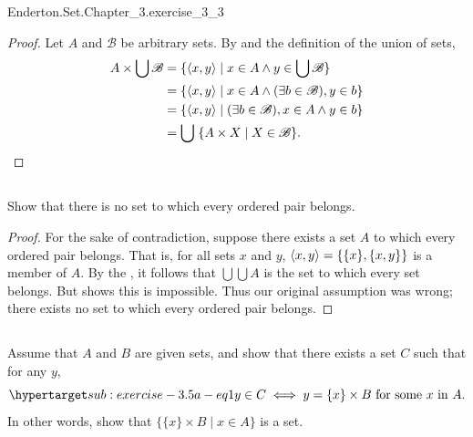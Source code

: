 \documentclass{report}
\begin{document}
    {Enderton.Set.Chapter\_3.exercise\_3\_3}

  \begin{proof}
    Let $A$ and $\mathscr{B}$ be arbitrary sets.
    By  and the definition of the union of sets,
    \begin{align*}
      A \times \bigcup\mathscr{B}
        & = \{ \left< x, y \right> \mid
          x \in A \land y \in \bigcup\mathscr{B} \} \\
        & = \{ \left< x, y \right> \mid
          x \in A \land (\exists b \in \mathscr{B}), y \in b \} \\
        & = \{ \left< x, y \right> \mid
          (\exists b \in \mathscr{B}), x \in A \land y \in b \} \\
        & = \bigcup\; \{ A \times X \mid X \in \mathscr{B} \}.
    \end{align*}
  \end{proof}

\subsection{}%

  Show that there is no set to which every ordered pair belongs.

  \begin{proof}
    For the sake of contradiction, suppose there exists a set $A$ to which every
      ordered pair belongs.
    That is, for all sets $x$ and $y$, $\left< x, y \right> = \{\{x\}, \{x, y\}\}$
      is a member of $A$.
    By the , it follows that $\bigcup\bigcup A$ is the
      set to which every set belongs.
    But  shows this is impossible.
    Thus our original assumption was wrong; there exists no set to which every
      ordered pair belongs.
  \end{proof}

\subsection{}%

  Assume that $A$ and $B$ are given sets, and show that there exists a set $C$
    such that for any $y$,
    \begin{equation}
      \hyperlabel{sub:exercise-3.5a-eq1}
      y \in C \iff y = \{x\} \times B \text{ for some } x \text{ in } A.
    \end{equation}
  In other words, show that $\{\{x\} \times B \mid x \in A\}$ is a set.
\end{document}
